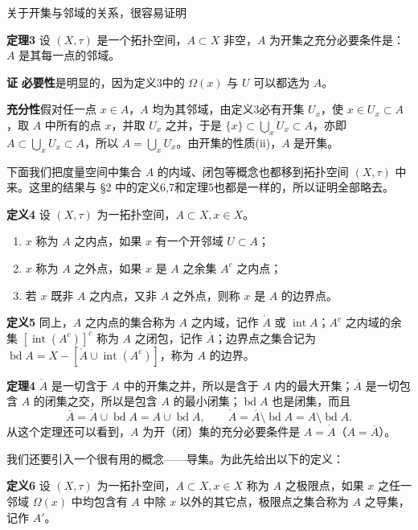 关于开集与邻域的关系，很容易证明

\noindent\textbf{定理3}\quad
设 $(X,\tau)$ 是一个拓扑空间，$A\subset X$ 非空，$A$ 为开集之充分必要条件是：$A$ 是其每一点的邻域。

\noindent\textbf{证}\quad
\textbf{必要性}\quad 是明显的，因为定义3中的 $\Omega(x)$ 与 $U$ 可以都选为 $A$。

\textbf{充分性}\quad 假对任一点 $x\in A$，$A$ 均为其邻域，由定义3必有开集 $U_x$，使 $x\in U_x\subset A$，取 $A$ 中所有的点 $x$，并取 $U_x$ 之并，于是 $\{x\}\subset\bigcup_x U_x\subset A$，亦即 $A\subset\bigcup_x U_x\subset A$，所以 $A=\bigcup_x U_x$。由开集的性质(ii)，$A$ 是开集。

下面我们把度量空间中集合 $A$ 的内域、闭包等概念也都移到拓扑空间 $(X,\tau)$ 中来。这里的结果与 \S2 中的定义6,7和定理5也都是一样的，所以证明全部略去。

\noindent\textbf{定义4}\quad
设 $(X,\tau)$ 为一拓扑空间，$A\subset X,x\in X$。
\begin{enumerate}[label=(\roman*)]
\item $x$ 称为 $A$ 之内点，如果 $x$ 有一个开邻域 $U\subset A$；
\item $x$ 称为 $A$ 之外点，如果 $x$ 是 $A$ 之余集 $A^c$ 之内点；
\item 若 $x$ 既非 $A$ 之内点，又非 $A$ 之外点，则称 $x$ 是 $A$ 的边界点。
\end{enumerate}

\noindent\textbf{定义5}\quad
同上，$A$ 之内点的集合称为 $A$ 之内域，记作 $\mathring A$ 或 $\operatorname{int}A$；$A^c$ 之内域的余集 $[\operatorname{int}(A^c)]^c$ 称为 $A$ 之闭包，记作 $\overline A$；边界点之集合记为 $\operatorname{bd}A=X-[\mathring A\cup\operatorname{int}(A^c)]$，称为 $A$ 的边界。

\noindent\textbf{定理4}\quad
$\mathring A$ 是一切含于 $A$ 中的开集之并，所以是含于 $A$ 内的最大开集；$\overline A$ 是一切包含 $A$ 的闭集之交，所以是包含 $A$ 的最小闭集；$\operatorname{bd}A$ 也是闭集，而且
\begin{equation}
 \overline A=\mathring A\cup\operatorname{bd}A=A\cup\operatorname{bd}A,
 \qquad
 \mathring A=\overline A\setminus\operatorname{bd}A=A\setminus\operatorname{bd}A.
 \tag{1}
\end{equation}
从这个定理还可以看到，$A$ 为开（闭）集的充分必要条件是 $A=\mathring A$（$A=\overline A$）。

我们还要引入一个很有用的概念——导集。为此先给出以下的定义：

\noindent\textbf{定义6}\quad
设 $(X,\tau)$ 为一拓扑空间，$A\subset X,x\in X$ 称为 $A$ 之极限点，如果 $x$ 之任一邻域 $\Omega(x)$ 中均包含有 $A$ 中除 $x$ 以外的其它点，极限点之集合称为 $A$ 之导集，记作 $A'$。

